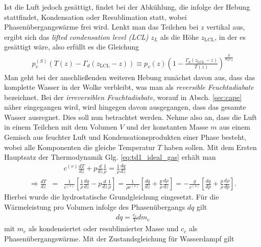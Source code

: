 \documentclass{book}
\begin{document}
Ist die Luft jedoch gesättigt, findet bei der Abkühlung, die infolge der Hebung stattfindet, Kondensation oder Resublimation statt, wobei Phasenübergangswärme frei wird. Lenkt man das Teilchen bei $z$ vertikal aus, ergibt sich das \textit{lifted condensation level (LCL)} $z_L$ als die Höhe $z_{\text{LCL}}$, in der es gesättigt wäre, also erfüllt es die Gleichung
%
\begin{eqnarray}
p_v^{(S)}\left(T\left(z\right) - \Gamma_d\left(z_{\text{LCL}} - z\right)\right) \equiv p_v\left(z\right)\left(1 - \frac{\Gamma_d\left(z_{\text{LCL}} - z\right)}{T\left(z\right)}\right)^{\frac{g}{R_d\Gamma_d}}
\end{eqnarray}
%
Man geht bei der anschließenden weiteren Hebung zunächst davon aus, dass das komplette Wasser in der Wolke verbleibt, was man als \textit{reversible Feuchtadiabate} bezeichnet. Bei der \textit{irreversiblen Feuchtadiabate}, worauf in Absch. \ref{sec:cape} näher eingegangen wird, wird hingegen davon ausgegangen, dass das gesamte Wasser ausregnet. Dies soll nun betrachtet werden. Nehme also an, dass die Luft in einem Teilchen mit dem Volumen $V$ und der konstanten Masse $m$ aus einem Gemisch aus feuchter Luft und Kondensationsprodukten einer Phase besteht, wobei alle Komponenten die gleiche Temperatur $T$ haben sollen. Mit dem Ersten Hauptsatz der Thermodynamik Glg. \eqref{eq:td1_ideal_gas} erhält man
%
\begin{eqnarray}
&&c^{(v)}\frac{dT}{dz} + p\frac{d}{dz}\frac{1}{\rho} = \frac{1}{\rho}\frac{dq}{dz}\nonumber\\
\Rightarrow\frac{dT}{dz} & = & \frac{1}{c^{(v)}}\left[\frac{1}{\rho}\frac{dq}{dz} - p\frac{d}{dz}\frac{1}{\rho}\right] = \frac{1}{\rho c^{(v)}}\left[\frac{dq}{dz} + \frac{p}{\rho}\frac{d\rho}{dz}\right] = -\frac{g}{c^{(v)}}\left[\frac{dq}{dp} + \frac{p}{\rho}\frac{d\rho}{dp}\right].\label{eq:feuchtad_deriv_1}
\end{eqnarray}
%
Hierbei wurde die hydrostatische Grundgleichung eingesetzt. Für die Wärmeleistung pro Volumen infolge des Phasenübergangs $dq$ gilt
%
\begin{eqnarray}
dq = \frac{c_{c}}{V}dm_c
\end{eqnarray}
%
mit $m_c$ als kondensiertet oder resublimierter Masse und $c_{c}$ als Phasenübergangswärme. Mit der Zustandsgleichung für Wasserdampf gilt
\end{document}
